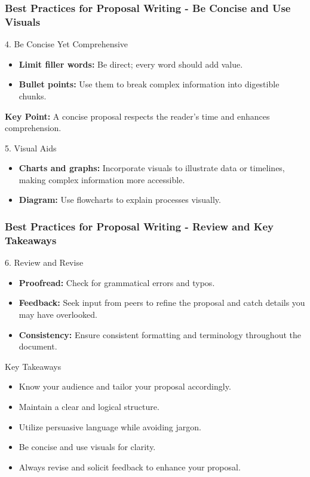 \documentclass[aspectratio=169]{beamer}
\begin{document}
\begin{frame}[fragile]
    \frametitle{Best Practices for Proposal Writing - Be Concise and Use Visuals}
    \begin{block}{4. Be Concise Yet Comprehensive}
        \begin{itemize}
            \item \textbf{Limit filler words:} Be direct; every word should add value.
            \item \textbf{Bullet points:} Use them to break complex information into digestible chunks.
        \end{itemize}
        \textbf{Key Point:} A concise proposal respects the reader's time and enhances comprehension.
    \end{block}

    \begin{block}{5. Visual Aids}
        \begin{itemize}
            \item \textbf{Charts and graphs:} Incorporate visuals to illustrate data or timelines, making complex information more accessible.
            \item \textbf{Diagram:} Use flowcharts to explain processes visually.
        \end{itemize}
    \end{block}
\end{frame}

\begin{frame}[fragile]
    \frametitle{Best Practices for Proposal Writing - Review and Key Takeaways}
    \begin{block}{6. Review and Revise}
        \begin{itemize}
            \item \textbf{Proofread:} Check for grammatical errors and typos.
            \item \textbf{Feedback:} Seek input from peers to refine the proposal and catch details you may have overlooked.
            \item \textbf{Consistency:} Ensure consistent formatting and terminology throughout the document.
        \end{itemize}
    \end{block}

    \begin{block}{Key Takeaways}
        \begin{itemize}
            \item Know your audience and tailor your proposal accordingly.
            \item Maintain a clear and logical structure.
            \item Utilize persuasive language while avoiding jargon.
            \item Be concise and use visuals for clarity.
            \item Always revise and solicit feedback to enhance your proposal.
        \end{itemize}
    \end{block}
\end{frame}
\end{document}
